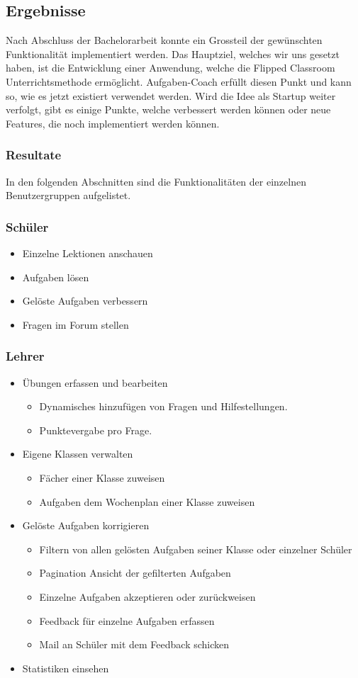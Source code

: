 \newpage
\subsection{Ergebnisse}
Nach Abschluss der Bachelorarbeit konnte ein Grossteil der gewünschten Funktionalität implementiert werden. Das Hauptziel, welches wir uns gesetzt haben, ist die Entwicklung einer Anwendung, welche die Flipped Classroom Unterrichtsmethode ermöglicht. Aufgaben-Coach erfüllt diesen Punkt und kann so, wie es jetzt existiert verwendet werden. Wird die Idee als Startup weiter verfolgt, gibt es einige Punkte, welche verbessert werden können oder neue Features, die noch implementiert werden können.
\subsubsection{Resultate}
In den folgenden Abschnitten sind die Funktionalitäten der einzelnen Benutzergruppen aufgelistet.
\subsubsection*{Schüler}
\begin{itemize}
	\item Einzelne Lektionen anschauen
	\item Aufgaben lösen
	\item Gelöste Aufgaben verbessern
	\item Fragen im Forum stellen
\end{itemize}

\subsubsection*{Lehrer}
\begin{itemize}
	\item Übungen erfassen und bearbeiten
	\begin{itemize}
		\item Dynamisches hinzufügen von Fragen und Hilfestellungen.
		\item Punktevergabe pro Frage.
	\end{itemize}
	\item Eigene Klassen verwalten
	\begin{itemize}
		\item Fächer einer Klasse zuweisen
		\item Aufgaben dem Wochenplan einer Klasse zuweisen
	\end{itemize}
	\item Gelöste Aufgaben korrigieren
	\begin{itemize}
		\item Filtern von allen gelösten Aufgaben seiner Klasse oder einzelner Schüler
		\item Pagination Ansicht der gefilterten Aufgaben
		\item Einzelne Aufgaben akzeptieren oder zurückweisen
		\item Feedback für einzelne Aufgaben erfassen
		\item Mail an Schüler mit dem Feedback schicken
	\end{itemize}
	\item Statistiken einsehen
\end{itemize}


